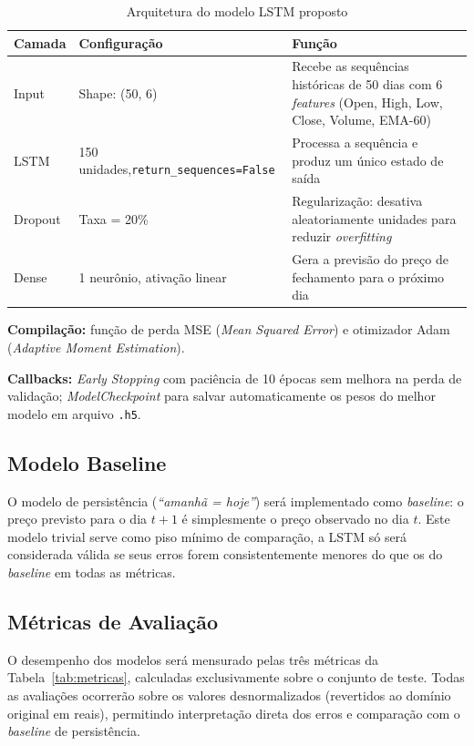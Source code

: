 \documentclass[12pt]{article}
\begin{document}
\begin{table}[ht]
\centering
\caption{Arquitetura do modelo LSTM proposto}
\label{tab:arq}
\begin{tabular}{p{2.5cm} p{4cm} p{6.5cm}}
\toprule
\textbf{Camada} & \textbf{Configuração} & \textbf{Função} \\
\midrule
Input    & Shape: (50, 6)               & Recebe as sequências históricas de 50 dias com 6 \textit{features} (Open, High, Low, Close, Volume, EMA-60) \\
LSTM     & 150 unidades,\newline \texttt{return\_sequences=False} & Processa a sequência e produz um único estado de saída \\
Dropout  & Taxa = 20\%                  & Regularização: desativa aleatoriamente unidades para reduzir \textit{overfitting} \\
Dense    & 1 neurônio, ativação linear  & Gera a previsão do preço de fechamento para o próximo dia \\
\bottomrule
\end{tabular}
\end{table}

\textbf{Compilação:} função de perda MSE (\textit{Mean Squared Error}) e
otimizador Adam (\textit{Adaptive Moment Estimation}).

\textbf{Callbacks:} \textit{Early Stopping} com paciência de 10 épocas sem
melhora na perda de validação; \textit{ModelCheckpoint} para salvar
automaticamente os pesos do melhor modelo em arquivo \texttt{.h5}.

\subsection{Modelo Baseline}

O modelo de persistência (\textit{``amanhã = hoje''}) será implementado como
\textit{baseline}: o preço previsto para o dia $t+1$ é simplesmente o preço
observado no dia $t$. Este modelo trivial serve como piso mínimo de comparação, 
a LSTM só será considerada válida se seus erros forem consistentemente
menores do que os do \textit{baseline} em todas as métricas.

\subsection{Métricas de Avaliação}

O desempenho dos modelos será mensurado pelas três métricas da
Tabela~\ref{tab:metricas}, calculadas exclusivamente sobre o conjunto de
teste. Todas as avaliações ocorrerão sobre os valores desnormalizados
(revertidos ao domínio original em reais), permitindo interpretação direta
dos erros e comparação com o \textit{baseline} de persistência.
\end{document}
